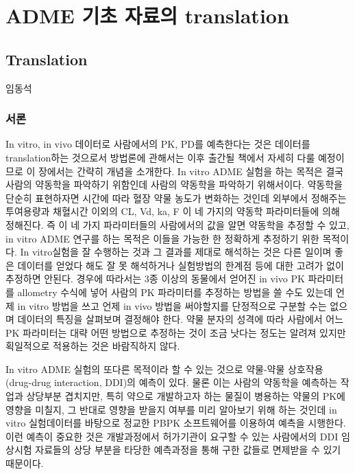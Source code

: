 \documentclass[
  11pt,
  krantz2, a4paper, twoside]{krantz}
\begin{document}
\part{ADME 기초 자료의 translation}\label{part-adme-uxae30uxcd08-uxc790uxb8ccuxc758-translation}

\chapter{Translation}\label{translation}

\Large\hfill

임동석
\normalsize

\section{서론}\label{uxc11cuxb860-7}

In vitro, in vivo 데이터로 사람에서의 PK, PD를 예측한다는 것은 데이터를 translation하는 것으로서 방법론에 관해서는 이후 출간될 책에서 자세히 다룰 예정이므로 이 장에서는 간략히 개념을 소개한다.
In vitro ADME 실험을 하는 목적은 결국 사람의 약동학을 파악하기 위함인데 사람의 약동학을 파악하기 위해서이다.
약동학을 단순히 표현하자면 시간에 따라 혈장 약물 농도가 변화하는 것인데 외부에서 정해주는 투여용량과 채혈시간 이외의 CL, Vd, ka, F 이 네 가지의 약동학 파라미터들에 의해 정해진다.
즉 이 네 가지 파라미터들의 사람에서의 값을 알면 약동학을 추정할 수 있고, in vitro ADME 연구를 하는 목적은 이들을 가능한 한 정확하게 추정하기 위한 목적이다.
In vitro실험을 잘 수행하는 것과 그 결과를 제대로 해석하는 것은 다른 일이며 좋은 데이터를 얻었다 해도 잘 못 해석하거나 실험방법의 한계점 등에 대한 고려가 없이 추정하면 안된다.
경우에 따라서는 3종 이상의 동물에서 얻어진 in vivo PK 파라미터를 allometry 수식에 넣어 사람의 PK 파라미터를 추정하는 방법을 쓸 수도 있는데 언제 in vitro 방법을 쓰고 언제 in vivo 방법을 써야할지를 단정적으로 구분할 수는 없으며 데이터의 특징을 살펴보며 결정해야 한다.
약물 분자의 성격에 따라 사람에서 어느 PK 파라미터는 대략 어떤 방법으로 추정하는 것이 조금 낫다는 정도는 알려져 있지만 획일적으로 적용하는 것은 바람직하지 않다.

In vitro ADME 실험의 또다른 목적이라 할 수 있는 것으로 약물-약물 상호작용 (drug-drug interaction, DDI)의 예측이 있다.
물론 이는 사람의 약동학을 예측하는 작업과 상당부분 겹치지만, 특히 약으로 개발하고자 하는 물질이 병용하는 약물의 PK에 영향을 미칠지, 그 반대로 영향을 받을지 여부를 미리 알아보기 위해 하는 것인데 in vitro 실험데이터를 바탕으로 정교한 PBPK 소프트웨어를 이용하여 예측을 시행한다.
이런 예측이 중요한 것은 개발과정에서 허가기관이 요구할 수 있는 사람에서의 DDI 임상시험 자료들의 상당 부분을 타당한 예측과정을 통해 구한 값들로 면제받을 수 있기 때문이다.
\end{document}
